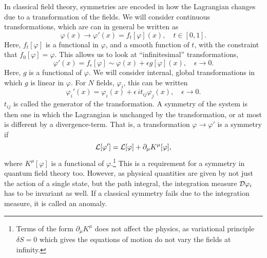 In classical field theory, symmetries are encoded in how the Lagrangian changes due to a transformation of the fields.
We will consider continuous transformations, which are can in general be written as
\begin{equation}
    \varphi(x) \longrightarrow \varphi'(x) = f_t[\varphi](x), \quad t \in [0, 1].
\end{equation}
Here, $f_t[\varphi]$ is a functional in $\varphi$, and a smooth function of $t$, with the constraint that $f_0[\varphi] = \varphi$.
This allows us to look at ``infinitesimal'' transformations,
\begin{equation}
    \label{infinitesimal transformation}
    \varphi'(x) = f_\epsilon[\varphi] \sim \varphi(x) + \epsilon g[\varphi](x), \quad \epsilon \rightarrow 0.
\end{equation}
Here, $g$ is a functional of $\varphi$.
We will consider internal, global transformations in which $g$ is linear in $\varphi$.
For $N$ fields, $\varphi_i$, this can be written
\begin{equation}
    \label{linear field transformation}
    \varphi_i'(x) = \varphi_i(x) + \epsilon \, i t_{ij} \varphi_j(x), \quad \epsilon \rightarrow 0.
\end{equation}
$t_{ij}$ is called the generator of the transformation.
A symmetry of the system is then one in which the Lagrangian is unchanged by the transformation, or at most is different by a divergence-term.
That is, a transformation $\varphi \rightarrow \varphi'$ is a symmetry if 
\begin{equation}
    \mathcal{L}[\varphi'] = \mathcal{L}[\varphi] + \partial_\mu K^\mu[\varphi],
\end{equation}
where $K^\mu[\varphi]$ is a functional of $\varphi$.\footnote{Terms of the form $\partial_\mu K^\mu$ does not affect the physics, as variational principle $\delta S = 0$ which gives the equations of motion do not vary the fields at infinity.}
This is a requirement for a symmetry in quantum field theory too.
However, as physical quantities are given by not just the action of a single state, but the path integral, the integration measure $\mathcal{D} \varphi_i$ has to be invariant as well.
If a classical symmetry fails due to the integration measure, it is called an anomaly.


